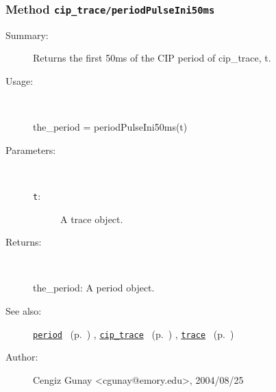 \subsubsection[Method \texttt{periodPulseIni50ms}]{Method \texttt{cip\_trace/periodPulseIni50ms}}%
%
\label{ref_cip_trace__periodPulseIni50ms}%
\hypertarget{ref_cip_trace__periodPulseIni50ms}{}%
\begin{description}
\item[Summary:]Returns the first 50ms of the CIP period of 
			cip\_trace, t. 
%
\item[Usage:]~%
\begin{lyxcode}%
the\_period = periodPulseIni50ms(t)
%
\end{lyxcode}%
%
%
\item[Parameters:]~
\begin{description}%
\item[\texttt{t}:]
 A trace object.
\end{description}%
%
\item[Returns:
]~

	the\_period: A period object.
%
%
\item[See also:]%
\hyperlink{ref_period}{\texttt{period}}%
\ (p.~\pageref{ref_period})%
%
, \hyperlink{ref_cip_trace}{\texttt{cip\_trace}}%
\ (p.~\pageref{ref_cip_trace})%
%
, \hyperlink{ref_trace}{\texttt{trace}}%
\ (p.~\pageref{ref_trace})%
%
%
\item[Author:]%
Cengiz Gunay <cgunay@emory.edu>, 2004/08/25
%
\end{description}
\methodline%
